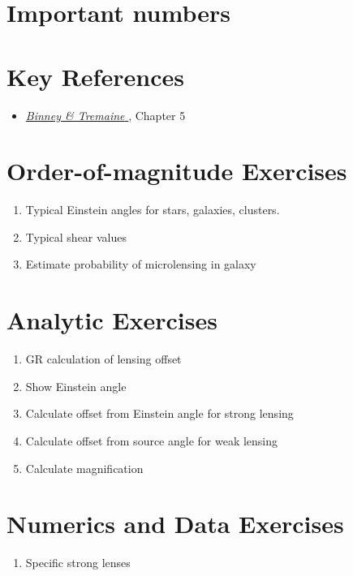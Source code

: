 \section{Important numbers}

\section{Key References}

\begin{itemize}
  \item
    \href{http://adsabs.harvard.edu/abs/2000asqu.book.....C}{
    {\it Binney \& Tremaine}
      \citet{cox00a}}, Chapter 5
\end{itemize}

\section{Order-of-magnitude Exercises}

\begin{enumerate} 
\item Typical Einstein angles for stars, galaxies, clusters.
\item Typical shear values
\item Estimate probability of microlensing in galaxy
\end{enumerate}   

\section{Analytic Exercises}

\begin{enumerate}
\item GR calculation of lensing offset
\item Show Einstein angle
\item Calculate offset from Einstein angle for strong lensing
\item Calculate offset from source angle for weak lensing
\item Calculate magnification
\end{enumerate}

\section{Numerics and Data Exercises}

\begin{enumerate}

\item Specific strong lenses
\end{enumerate}


  
